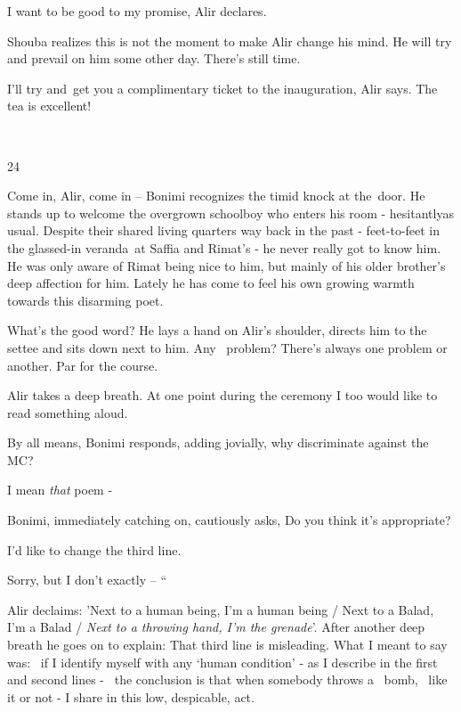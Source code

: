\documentclass[letterpaper]{article}
\begin{document}
{\textquotedbl}I want to be good to my promise,{\textquotedbl} Alir declares.

Shouba realizes this is not the moment to make Alir change his mind. He will try and prevail on him some other day.
There's still time. 

{\textquotedbl}I'll try and~get you a complimentary ticket to the inauguration,{\textquotedbl} Alir says.
{\textquotedbl}The tea is excellent!{\textquotedbl}

~

24~

{\textquotedbl}Come in, Alir, come in -- {\textquotedbl} Bonimi recognizes the timid knock at the~door. He stands up to
welcome the overgrown schoolboy who enters his room - hesitantlyas usual. Despite their shared living quarters way back
in the past - feet-to-feet in the glassed-in veranda~at Saffia and Rimat's{ }{}- he never really got to
know him. He was only aware of Rimat being nice to him, but mainly of his older brother's deep affection for him.
Lately he has come to feel his own growing warmth towards this disarming poet. 

{\textquotedbl}What's the good word?{\textquotedbl} He lays a hand on Alir's shoulder, directs him to the settee and
sits down next to him. {\textquotedbl}Any \ problem? There's always one problem or another. Par for the
course.{\textquotedbl} 

Alir takes a deep breath. {\textquotedbl}At one point during the ceremony I too would like to read something
aloud.{\textquotedbl} 

{\textquotedbl}By all means,{\textquotedbl} Bonimi responds, adding jovially, {\textquotedbl}why discriminate against
the MC?{\textquotedbl} 

{\textquotedbl}I mean \textit{that} poem -{\textquotedbl} 

Bonimi, immediately catching on, cautiously asks, {\textquotedbl}Do you think it's appropriate?{\textquotedbl} 

{\textquotedbl}I'd like to change the third line.{\textquotedbl} 

{\textquotedbl}Sorry, but I don't exactly -- `` 

Alir declaims: {\textquotedbl}'Next to a human being, I'm a human being / Next to a Balad, I'm a Balad / \textit{Next to
a throwing hand, I'm the grenade}{}'.{\textquotedbl} After another deep breath he goes on to explain:
{\textquotedbl}That third line is misleading. What I meant to say was:~ if I identify myself with any `human condition'
- as I describe in the first and second lines -~ the conclusion is that when somebody throws a~ bomb,~ like it or not -
I share in this low, despicable, act. {\textquotedbl} 
\end{document}
